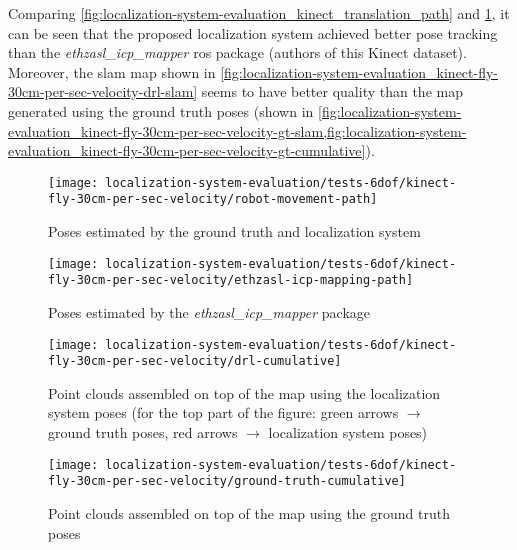 Comparing \cref{fig:localization-system-evaluation_kinect_translation_path} and \cref{fig:localization-system-evaluation_kinect_translation_path2}, it can be seen that the proposed localization system achieved better pose tracking than the \emph{ethzasl\_icp\_mapper} \gls{ros} package \cite{Pomerleau2011} (authors of this Kinect dataset). Moreover, the \gls{slam} map shown in \cref{fig:localization-system-evaluation_kinect-fly-30cm-per-sec-velocity-drl-slam} seems to have better quality than the map generated using the ground truth poses (shown in \cref{fig:localization-system-evaluation_kinect-fly-30cm-per-sec-velocity-gt-slam,fig:localization-system-evaluation_kinect-fly-30cm-per-sec-velocity-gt-cumulative}).

\begin{figure}[H]
	\centering
	\begin{minipage}[b]{0.24\textwidth}
		\centering
		\texttt{[image: localization-system-evaluation/tests-6dof/kinect-fly-30cm-per-sec-velocity/robot-movement-path]}
		\caption{Poses estimated by the ground truth and localization system}
		\label{fig:localization-system-evaluation_kinect_translation_path}
	\end{minipage}\hfill
	\begin{minipage}[b]{0.24\textwidth}
		\centering
		\texttt{[image: localization-system-evaluation/tests-6dof/kinect-fly-30cm-per-sec-velocity/ethzasl-icp-mapping-path]}
		\caption{Poses estimated by the \emph{ethzasl\_icp\_mapper}  package \cite{Pomerleau2011}}
		\label{fig:localization-system-evaluation_kinect_translation_path2}
	\end{minipage}
\end{figure}

\begin{figure}[H]
	\centering
	\texttt{[image: localization-system-evaluation/tests-6dof/kinect-fly-30cm-per-sec-velocity/drl-cumulative]}
	\caption{Point clouds assembled on top of the map using the localization system poses (for the top part of the figure: green arrows $\rightarrow$ ground truth poses, red arrows $\rightarrow$ localization system poses)}
	\label{fig:localization-system-evaluation_kinect-fly-30cm-per-sec-velocity-drl-cumulative}
\end{figure}

\begin{figure}[H]
	\centering
	\texttt{[image: localization-system-evaluation/tests-6dof/kinect-fly-30cm-per-sec-velocity/ground-truth-cumulative]}
	\caption{Point clouds assembled on top of the map using the ground truth poses}
	\label{fig:localization-system-evaluation_kinect-fly-30cm-per-sec-velocity-gt-cumulative}
\end{figure}


